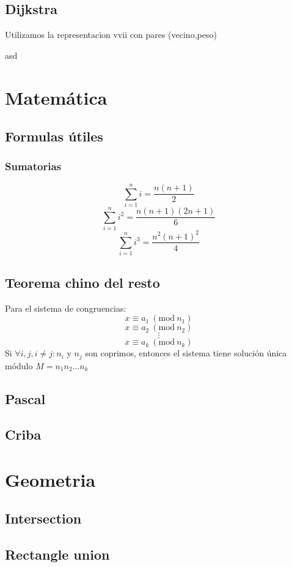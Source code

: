 \documentclass[oneside]{book}
\newcommand{\Mod}[1]{\ (\mathrm{mod}\ #1)}
\begin{document}
	\section{Dijkstra}
	Utilizamos la representacion vvii con pares (vecino,peso)
	\begin{codigo}
	asd
	\end{codigo}
	\chapter{Matem\'atica}
	\section{Formulas \'utiles}
	\subsection{Sumatorias}
		\[\sum_{i=1}^{n}i=\frac{n(n+1)}{2}\]
		\[\sum_{i=1}^{n}i^2=\frac{n(n+1)(2n+1)}{6}\]
		\[\sum_{i=1}^{n}i^3=\frac{n^2(n+1)^2}{4}\]
	\section{Teorema chino del resto}
	Para el sistema de congruencias:
	\[x\equiv a_1 \Mod {n_1} \]
	\[x\equiv a_2 \Mod {n_2} \]
	\[\vdots\]
	\[x\equiv a_k \Mod {n_k} \]
	Si $\forall i,j, i\neq j: n_i$ y $n_j$ son coprimos, entonces el sistema tiene soluci\'on \'unica m\'odulo $M=n_1n_2...n_k$
	\section{Pascal}
	
	\section{Criba}
	
	
	\chapter{Geometria}
	\section{Intersection}
	
	\section{Rectangle union}
	
\end{document}
